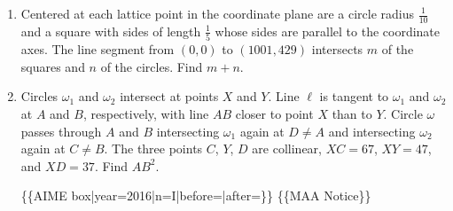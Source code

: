 \documentclass{article}
\begin{document}
\begin{enumerate}[label=\arabic*., itemsep=0.5em]
\vspace{0.5em}\item Centered at each lattice point in the coordinate plane are a circle radius \(\frac{1}{10}\) and a square with sides of length \(\frac{1}{5}\) whose sides are parallel to the coordinate axes. The line segment from \((0,0)\) to \((1001, 429)\) intersects \(m\) of the squares and \(n\) of the circles. Find \(m + n\).\par \vspace{0.5em}\item Circles \(\omega_1\) and \(\omega_2\) intersect at points \(X\) and \(Y\). Line \(\ell\) is tangent to \(\omega_1\) and \(\omega_2\) at \(A\) and \(B\), respectively, with line \(AB\) closer to point \(X\) than to \(Y\). Circle \(\omega\) passes through \(A\) and \(B\) intersecting \(\omega_1\) again at \(D \neq A\) and intersecting \(\omega_2\) again at \(C \neq B\). The three points \(C\), \(Y\), \(D\) are collinear, \(XC = 67\), \(XY = 47\), and \(XD = 37\). Find \(AB^2\).



\{\{AIME box|year=2016|n=I|before=|after=\}\}
\{\{MAA Notice\}\}\par \vspace{0.5em}
\end{enumerate}
\end{document}
